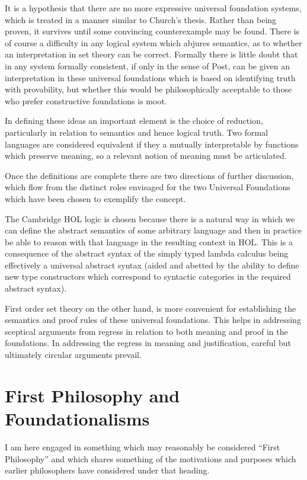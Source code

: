 \documentclass[10pt,titlepage]{book}
\begin{document}
It is a hypothesis that there are no more expressive universal foundation systems, which is treated in a manner similar to Church's thesis.
Rather than being proven, it survives until some convincing counterexample may be found.
There is of course a difficulty in any logical system which abjures semantics, as to whether an interpretation in set theory can be correct.
Formally there is little doubt that in any system formally consistent, if only in the sense of Post, can be given an interpretation in these universal foundations which is based on identifying truth with provability, but whether this would be philosophically acceptable to those who prefer constructive foundations is moot.

In defining these ideas an important element is the choice of reduction, particularly in relation to semantics and hence logical truth.
Two formal languages are considered equivalent if they a mutually interpretable by functions which preserve meaning, so a relevant notion of meaning must be articulated.

Once the definitions are complete there are two directions of further discussion, which flow from the distinct roles envisaged for the two Universal Foundations which have been chosen to exemplify the concept.

The Cambridge HOL logic is chosen because there is a natural way in which we can define the abstract semantics of some arbitrary language and then in practice be able to reason with that language in the resulting context in HOL.
This is a consequence of the abstract syntax of the simply typed lambda calculus being effectively a universal abstract syntax (aided and abetted by the ability to define new type constructors which correspond to syntactic categories in the required abstract syntax).

First order set theory on the other hand, is more convenient for establishing the semantics and proof rules of these universal foundations.
This helps in addressing sceptical arguments from regress in relation to both meaning and proof in the foundations.
In addressing the regress in meaning and justification, careful but ultimately circular arguments prevail.

\chapter{First Philosophy and Foundationalisms}

I am here engaged in something which may reasonably be considered ``First Philosophy'' and which shares something of the motivations and purposes which earlier philosophers have considered under that heading.
\end{document}
